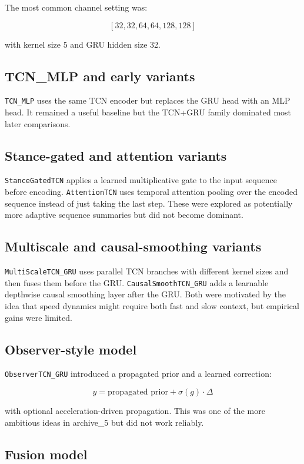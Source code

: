 \documentclass[11pt,a4paper]{article}
\begin{document}
The most common channel setting was:

\[
[32, 32, 64, 64, 128, 128]
\]

with kernel size 5 and GRU hidden size 32.

\subsection{TCN\_MLP and early variants}

\texttt{TCN\_MLP} uses the same TCN encoder but replaces the GRU head with an MLP head. It remained a useful baseline but the TCN+GRU family dominated most later comparisons.

\subsection{Stance-gated and attention variants}

\texttt{StanceGatedTCN} applies a learned multiplicative gate to the input sequence before encoding. \texttt{AttentionTCN} uses temporal attention pooling over the encoded sequence instead of just taking the last step. These were explored as potentially more adaptive sequence summaries but did not become dominant.

\subsection{Multiscale and causal-smoothing variants}

\texttt{MultiScaleTCN\_GRU} uses parallel TCN branches with different kernel sizes and then fuses them before the GRU. \texttt{CausalSmoothTCN\_GRU} adds a learnable depthwise causal smoothing layer after the GRU. Both were motivated by the idea that speed dynamics might require both fast and slow context, but empirical gains were limited.

\subsection{Observer-style model}

\texttt{ObserverTCN\_GRU} introduced a propagated prior and a learned correction:

\[
\hat{y} = \text{propagated prior} + \sigma(g)\cdot \Delta
\]

with optional acceleration-driven propagation. This was one of the more ambitious ideas in archive\_5 but did not work reliably.

\subsection{Fusion model}
\end{document}
